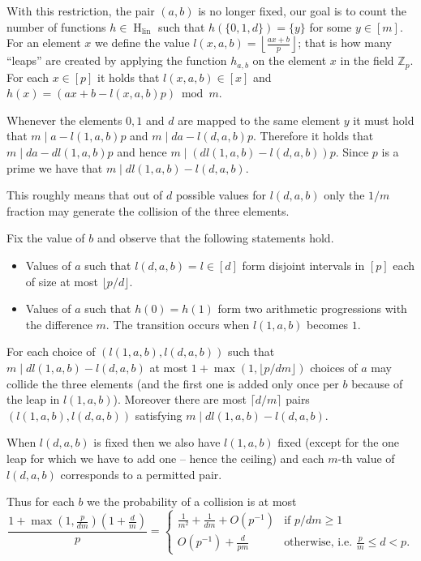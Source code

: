 \documentclass{article}
\newcommand{\hlin}{\operatorname{H}_{\operatorname{lin}}}
\begin{document}
With this restriction, the pair $(a, b)$ is no longer fixed, our goal is to count the number of functions $h \in \hlin$ such that $h(\{0, 1, d\}) = \{y\}$ for some $y \in [m]$.
For an element $x$ we define the value $l(x, a, b) = \left\lfloor\frac{ax + b}{p}\right\rfloor$; that is how many ``leaps'' are created by applying the function $h_{a, b}$ on the element $x$ in the field $\mathbb{Z}_p$.
For each $x \in [p]$ it holds that $l(x, a, b) \in [x]$ and $h(x) = (ax + b - l(x, a, b)p) \bmod m$.

Whenever the elements $0, 1$ and $d$ are mapped to the same element $y$ it must hold that $m \mid a - l(1, a, b)p$ and $m \mid da - l(d, a, b)p$.
Therefore it holds that $m \mid da - dl(1, a, b)p$ and hence $m \mid (dl(1, a, b) - l(d, a, b))p$.
Since $p$ is a prime we have that $m \mid dl(1, a, b) - l(d, a, b)$.

This roughly means that out of $d$ possible values for $l(d, a, b)$ only the $1 / m$ fraction may generate the collision of the three elements.

Fix the value of $b$ and observe that the following statements hold.

\begin{itemize}
  \item Values of $a$ such that $l(d, a, b) = l \in [d]$ form disjoint intervals in $[p]$ each of size at most $\lfloor p/d \rfloor$.
  \item Values of $a$ such that $h(0) = h(1)$ form two arithmetic progressions with the difference $m$. The transition occurs when $l(1, a, b)$ becomes $1$.
\end{itemize}

For each choice of $(l(1, a, b), l(d, a, b))$ such that $m \mid dl(1, a, b) - l(d, a, b)$ at most $1 + \max\left(1, \lfloor p/dm \rfloor\right)$ choices of $a$ may collide the three elements (and the first one is added only once per $b$ because of the leap in $l(1, a, b)$).
Moreover there are most $\lceil d / m \rceil$ pairs $(l(1, a, b), l(d, a, b))$ satisfying $m \mid dl(1, a, b) - l(d, a, b)$.

When $l(d, a, b)$ is fixed then we also have $l(1, a, b)$ fixed (except for the one leap for which we have to add one -- hence the ceiling) and each $m$-th value of $l(d, a, b)$ corresponds to a permitted pair.

Thus for each $b$ we the probability of a collision is at most
\[
\frac{1 + \max\left(1, \frac{p}{dm}\right)\left(1 + \frac{d}{m}\right)}{p} = \begin{cases}
	\frac{1}{m^2} + \frac{1}{dm} + O\left(p^{-1}\right) & \mbox{if } p/dm \geq 1 \\
	O\left(p^{-1}\right) + \frac{d}{pm} & \mbox{otherwise, i.e. } \frac{p}{m} \leq d < p.
\end{cases}
\]
\end{document}
